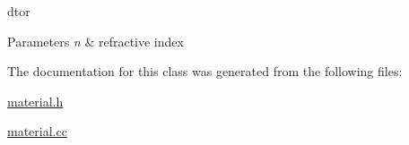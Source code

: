 dtor 


\begin{DoxyParams}{Parameters}
{\em n} & refractive index \\
\hline
\end{DoxyParams}


The documentation for this class was generated from the following files\+:\begin{DoxyCompactItemize}
\item 
\hyperlink{material_8h}{material.\+h}\item 
\hyperlink{material_8cc}{material.\+cc}\end{DoxyCompactItemize}
